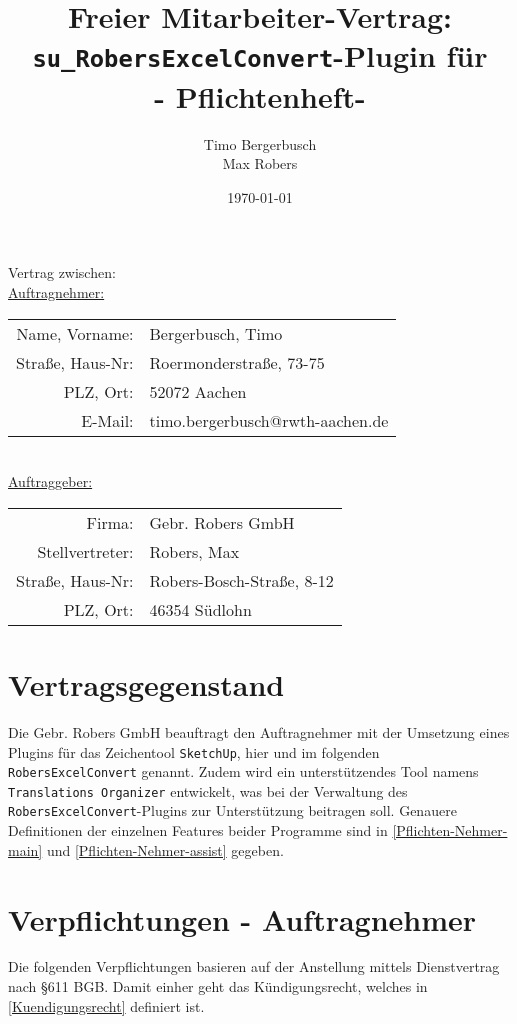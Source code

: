 \documentclass[a4paper,12pt]{article}
\title{Freier Mitarbeiter-Vertrag: \texttt{su\_RobersExcelConvert}-Plugin für \sketchup\\ - Pflichtenheft-}
\date{\germanDate\today}
\author{Timo Bergerbusch\\ Max Robers}
\newcommand{\robersexcelconvert}{\texttt{RobersExcelConvert}\xspace}
\newcommand{\assisttool}{\texttt{Translations Organizer}}
\newcommand{\sketchup}{\texttt{SketchUp}\xspace}
\newcommand{\geberName}{Gebr. Robers GmbH\xspace}
\begin{document}
	\maketitle	
	\begin{center}
		Vertrag zwischen:\\
		\vspace{1cm}
		\underline{Auftragnehmer:}\\
		\begin{tabular}{r l}
			Name, Vorname: & Bergerbusch, Timo \\
			Straße, Haus-Nr: & Roermonderstraße, 73-75 \\
			PLZ, Ort: & 52072 Aachen \\
			E-Mail: & timo.bergerbusch@rwth-aachen.de
		\end{tabular}\\
		\vspace{1cm}
		\underline{Auftraggeber:}\\
		\begin{tabular}{r l}
			Firma: & \geberName\\
			Stellvertreter: &  Robers, Max \\
			Straße, Haus-Nr: &  Robers-Bosch-Straße, 8-12\\
			PLZ, Ort: & 46354 Südlohn
		\end{tabular}
	\end{center}

	\newpage
	\section{Vertragsgegenstand}
		Die \geberName beauftragt den Auftragnehmer mit der Umsetzung eines Plugins für das Zeichentool \sketchup, hier und im folgenden \glqq\robersexcelconvert\grqq\xspace genannt. Zudem wird ein unterstützendes Tool namens \glqq\assisttool\grqq\xspace entwickelt, was bei der Verwaltung des \robersexcelconvert-Plugins zur Unterstützung beitragen soll. Genauere Definitionen der einzelnen Features beider Programme sind in \ref{Pflichten-Nehmer-main} und \ref{Pflichten-Nehmer-assist} gegeben.

	\section{Verpflichtungen - Auftragnehmer} \label{Pflichten-Nehmer}
		Die folgenden Verpflichtungen basieren auf der Anstellung mittels Dienstvertrag nach §611 BGB. Damit einher geht das Kündigungsrecht, welches in \ref{Kuendigungsrecht} definiert ist.
\end{document}
